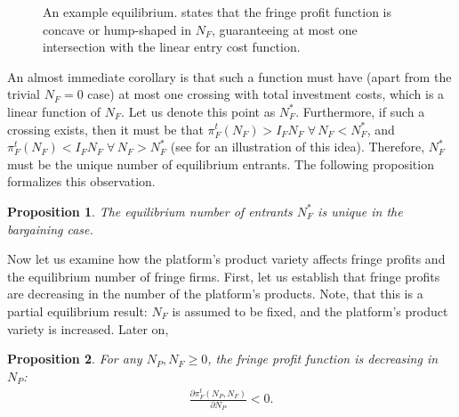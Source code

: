 \documentclass[a4paper]{article}
\newtheorem{proposition}{Proposition}
\begin{document}
\begin{figure}[ht]
    \centering
    \caption{An example equilibrium.  states that the fringe profit function is concave or hump-shaped in $N_F$, guaranteeing at most one intersection with the linear entry cost function.}
    \label{fig:equilibrium}
\end{figure}

An almost immediate corollary is that such a function must have (apart from the trivial $N_F=0$ case) at most one crossing with total investment costs, which is a linear function of $N_F$.
Let us denote this point as $N_F^*$.
Furthermore, if such a crossing exists, then it must be that $\pi_F^t(N_F) > I_F N_F \;\forall\, N_F < N_F^*$, and $\pi_F^t(N_F) < I_F N_F \;\forall\, N_F > N_F^*$ (see  for an illustration of this idea).
Therefore, $N_F^*$ must be the unique number of equilibrium entrants.
The following proposition formalizes this observation.
\begin{proposition}
    \label{prop:unique_equilibrium}
    The equilibrium number of entrants $N_F^*$ is unique in the bargaining case.
\end{proposition}

Now let us examine how the platform's product variety affects fringe profits and the equilibrium number of fringe firms.
First, let us establish that fringe profits are decreasing in the number of the platform's products.
Note, that this is a partial equilibrium result: $N_F$ is assumed to be fixed, and the platform's product variety is increased.
Later on, 
\begin{proposition}
    \label{prop:fringe_profits_partial}
    For any $N_P, N_F \geq 0$, the fringe profit function is decreasing in $N_P$:
    \begin{align*}
        \frac{\partial \pi_F^t(N_P, N_F)}{\partial N_P} < 0.
    \end{align*}
\end{proposition}
\end{document}
